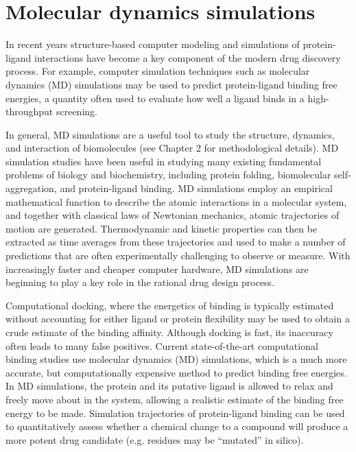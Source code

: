 
\section{Molecular dynamics simulations}

In recent years structure-based computer modeling and simulations of protein-ligand interactions have become a key component of the modern drug discovery process. For example, computer simulation techniques such as molecular dynamics (MD) simulations may be used to predict protein-ligand binding free energies,  a quantity often used to evaluate how well a ligand binds in a high-throughput screening.

In general, MD simulations are a useful tool to study the structure, dynamics, and interaction of biomolecules (see Chapter 2 for methodological details).  MD simulation studies have been useful in studying many existing fundamental problems of biology and biochemistry, including protein folding, biomolecular self-aggregation, and protein-ligand binding.  MD simulations employ an empirical mathematical function to describe the atomic interactions in a molecular system, and together with classical laws of Newtonian mechanics, atomic trajectories of motion are generated.  Thermodynamic and kinetic properties can then be extracted as time averages from these trajectories and used to make a number of predictions that are often experimentally challenging to observe or measure.  With increasingly faster and cheaper computer hardware, MD simulations are beginning to play a key role in the rational drug design process. 

Computational docking, where the energetics of binding is typically estimated without accounting for either ligand or protein flexibility may be used to obtain a crude estimate of the binding affinity.  Although docking is fast, its inaccuracy often leads to many false positives.  Current state-of-the-art computational binding studies use molecular dynamics (MD) simulations, which is a much more accurate, but computationally expensive method to predict binding free energies.   In MD simulations, the protein and its putative ligand is allowed to relax and freely move about in the system, allowing a realistic estimate of the binding free energy to be made. Simulation trajectories of protein-ligand binding can be used to quantitatively assess whether a chemical change to a compound will produce a more potent drug candidate (e.g.  residues may be ``mutated'' in silico).


